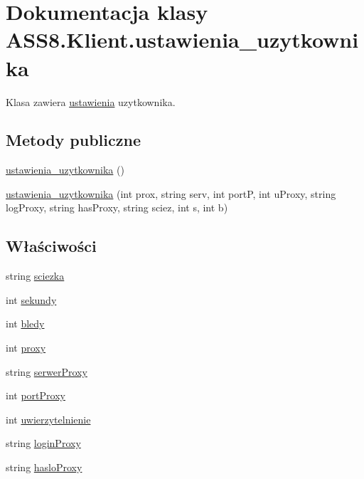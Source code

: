 \hypertarget{a00029}{
\section{Dokumentacja klasy ASS8.Klient.ustawienia\_\-uzytkownika}
\label{d5/d16/a00029}
}
Klasa zawiera \hyperlink{a00028}{ustawienia} uzytkownika.  


\subsection*{Metody publiczne}
\begin{CompactItemize}
\item 
\hyperlink{a00029_03466d9eb12e9b7aa0399f437bc1b799}{ustawienia\_\-uzytkownika} ()
\item 
\hyperlink{a00029_e9279b1a6008a696e2d0d85ec19d9a5a}{ustawienia\_\-uzytkownika} (int prox, string serv, int portP, int uProxy, string logProxy, string hasProxy, string sciez, int s, int b)
\end{CompactItemize}
\subsection*{Właściwości}
\begin{CompactItemize}
\item 
string \hyperlink{a00029_220e3be6afc323874c7a4c71bce9d4f8}{sciezka}
\item 
int \hyperlink{a00029_6993993d452914c9b2d1fd7114c8df6d}{sekundy}
\item 
int \hyperlink{a00029_a32775110055e3d6ef87f68857d6d054}{bledy}
\item 
int \hyperlink{a00029_0eee1c76a0322faf06623907b72d57d8}{proxy}
\item 
string \hyperlink{a00029_8a03c32e5d015f5378462ccc9b231c78}{serwerProxy}
\item 
int \hyperlink{a00029_d7179e32ebfa06abd8fc107b8e11051d}{portProxy}
\item 
int \hyperlink{a00029_21b09b5678e359c516ac5d1da7e789c2}{uwierzytelnienie}
\item 
string \hyperlink{a00029_1e01f16411005fc34400db64f7a36641}{loginProxy}
\item 
string \hyperlink{a00029_30f0e0b5c0e53c414a8d6d873f26e517}{hasloProxy}
\end{CompactItemize}
